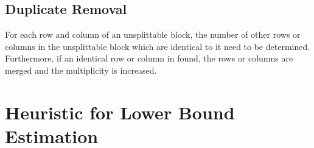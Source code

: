 \documentclass[10pt,twocolumn]{witseiepaper}
\begin{document}
\subsection{Duplicate Removal}

For each row and column of an unsplittable block, the number of other rows or columns in the unsplittable
block which are identical to it need to be determined. Furthermore, if an identical row or column in found,
the rows or columns are merged and the multiplicity is increased.

\section{Heuristic for Lower Bound Estimation}
\end{document}
